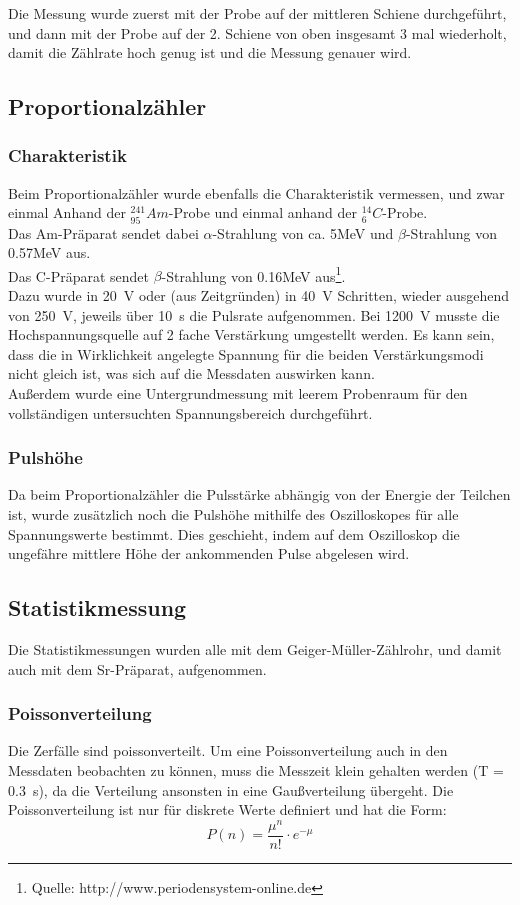 \documentclass[12pt,a4paper]{article}
\begin{document}
Die Messung wurde zuerst mit der Probe auf der mittleren Schiene durchgeführt, und dann mit der Probe auf der 2. Schiene von oben insgesamt 3 mal wiederholt, damit die Zählrate hoch genug ist und die Messung genauer wird.
\subsection{Proportionalzähler}

\subsubsection{Charakteristik}
Beim Proportionalzähler wurde ebenfalls die Charakteristik vermessen, und zwar einmal Anhand der $_{95}^{241}Am$-Probe und einmal anhand der $_6^{14}C$-Probe. \\
Das Am-Präparat sendet dabei $\alpha$-Strahlung von ca. 5MeV und $\beta$-Strahlung von 0.57MeV aus.\\
Das C-Präparat sendet $\beta$-Strahlung von 0.16MeV aus\footnote{Quelle: http://www.periodensystem-online.de}.\\
Dazu wurde in \SI{20}{V} oder (aus Zeitgründen) in \SI{40}{V} Schritten, wieder ausgehend von \SI{250}{V}, jeweils über \SI{10}{s} die Pulsrate aufgenommen. Bei \SI{1200}{V} musste die Hochspannungsquelle auf 2 fache Verstärkung umgestellt werden. Es kann sein, dass die in Wirklichkeit angelegte Spannung für die beiden Verstärkungsmodi nicht gleich ist, was sich auf die Messdaten auswirken kann.\\
Außerdem wurde eine Untergrundmessung mit leerem Probenraum für den vollständigen untersuchten Spannungsbereich durchgeführt.

\subsubsection{Pulshöhe}
Da beim Proportionalzähler die Pulsstärke abhängig von der Energie der Teilchen ist, wurde zusätzlich noch die Pulshöhe mithilfe des Oszilloskopes für alle Spannungswerte bestimmt.  Dies geschieht, indem auf dem Oszilloskop die ungefähre mittlere Höhe der ankommenden Pulse abgelesen wird.

\subsection{Statistikmessung}
Die Statistikmessungen wurden alle mit dem Geiger-Müller-Zählrohr, und damit auch mit dem Sr-Präparat, aufgenommen.
\subsubsection{Poissonverteilung}
Die Zerfälle sind poissonverteilt. Um eine Poissonverteilung auch in den Messdaten beobachten zu können, muss die Messzeit klein gehalten werden (T = \SI{0.3}{s}), da die Verteilung ansonsten in eine Gaußverteilung übergeht. Die Poissonverteilung ist nur für diskrete Werte definiert und hat die Form:
\begin{equation}
P(n) = \dfrac{\mu ^n}{n!} \cdot e^{-\mu}
\end{equation}
\end{document}
